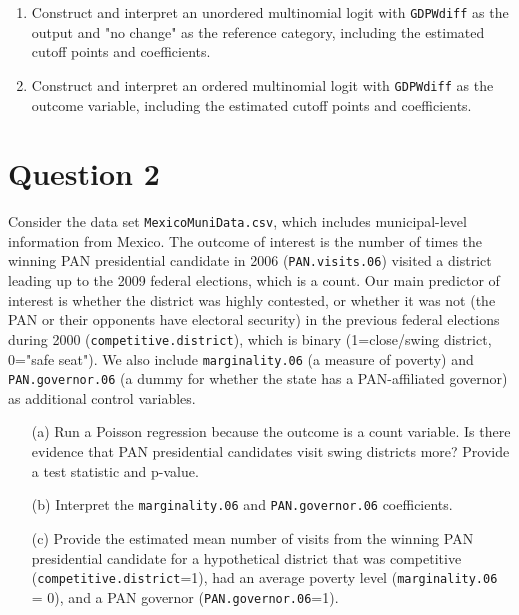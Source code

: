 \documentclass[12pt,letterpaper]{article}
\begin{document}
\begin{enumerate}
	\item Construct and interpret an unordered multinomial logit with \texttt{GDPWdiff} as the output and "no change" as the reference category, including the estimated cutoff points and coefficients.
	\item Construct and interpret an ordered multinomial logit with \texttt{GDPWdiff} as the outcome variable, including the estimated cutoff points and coefficients.
	
	
\end{enumerate}

\section*{Question 2} 
\vspace{.25cm}

\noindent Consider the data set \texttt{MexicoMuniData.csv}, which includes municipal-level information from Mexico. The outcome of interest is the number of times the winning PAN presidential candidate in 2006 (\texttt{PAN.visits.06}) visited a district leading up to the 2009 federal elections, which is a count. Our main predictor of interest is whether the district was highly contested, or whether it was not (the PAN or their opponents have electoral security) in the previous federal elections during 2000 (\texttt{competitive.district}), which is binary (1=close/swing district, 0="safe seat"). We also include \texttt{marginality.06} (a measure of poverty) and \texttt{PAN.governor.06} (a dummy for whether the state has a PAN-affiliated governor) as additional control variables. 

\begin{enumerate}
	\item [(a)]
	Run a Poisson regression because the outcome is a count variable. Is there evidence that PAN presidential candidates visit swing districts more? Provide a test statistic and p-value.

	\item [(b)]
	Interpret the \texttt{marginality.06} and \texttt{PAN.governor.06} coefficients.
	
	\item [(c)]
	Provide the estimated mean number of visits from the winning PAN presidential candidate for a hypothetical district that was competitive (\texttt{competitive.district}=1), had an average poverty level (\texttt{marginality.06} = 0), and a PAN governor (\texttt{PAN.governor.06}=1).
	
\end{enumerate}
\end{document}
